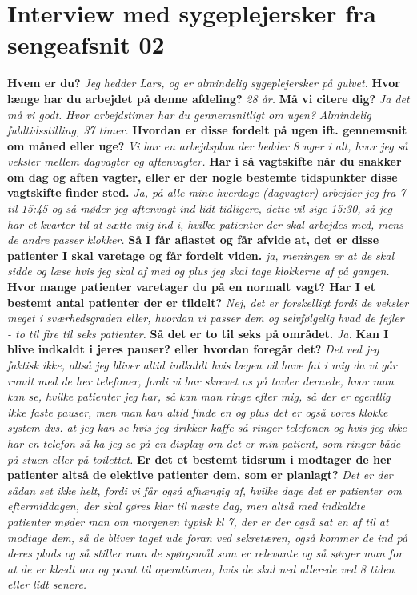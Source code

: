 \section{Interview med sygeplejersker fra sengeafsnit 02} \label{bilagO2}
\textbf{ Hvem er du?}
\textit{Jeg hedder Lars, og er almindelig sygeplejersker på gulvet.}
\textbf{Hvor længe har du arbejdet på denne afdeling?} 
\textit{28 år.}
\textbf{ Må vi citere dig? }
\textit{ Ja det må vi godt. }
\textit{Hvor arbejdstimer har du gennemsnitligt om ugen?}
\textit{ Almindelig fuldtidsstilling, 37 timer. }
\textbf{Hvordan er disse fordelt på ugen ift. gennemsnit om måned eller uge?}
\textit{Vi har en arbejdsplan der hedder 8 uger i alt, hvor jeg så veksler mellem dagvagter og aftenvagter.}
\textbf{Har i så vagtskifte når du snakker om dag og aften vagter, eller er der nogle bestemte tidspunkter disse vagtskifte finder sted.}
\textit{Ja, på alle mine hverdage (dagvagter) arbejder jeg fra 7 til 15:45 og så møder jeg aftenvagt ind lidt tidligere, dette vil sige 15:30, så jeg har et kvarter til at sætte mig ind i, hvilke patienter der skal arbejdes med, mens de andre passer klokker. }
\textbf{Så I får aflastet og får afvide at, det er disse patienter I skal varetage og får fordelt viden.}
\textit{ja, meningen er at de skal sidde og læse hvis jeg skal af med og plus jeg skal tage klokkerne af på gangen.}
\textbf{Hvor mange patienter varetager du på en normalt vagt? Har I et bestemt antal patienter der er tildelt?}
\textit{ Nej, det er forskelligt fordi de veksler meget i sværhedsgraden eller, hvordan vi passer dem og selvfølgelig hvad de fejler - to til fire til seks patienter.}
\textbf{ Så det er to til seks på området. }
\textit{Ja.}
\textbf{Kan I blive indkaldt i jeres pauser? eller hvordan foregår det?}
\textit{Det ved jeg faktisk ikke, altså jeg bliver altid indkaldt hvis lægen vil have fat i mig da vi går rundt med de her telefoner, fordi vi har skrevet os på tavler dernede, hvor man kan se, hvilke patienter jeg har, så kan man ringe efter mig, så der er egentlig ikke faste pauser, men man kan altid finde en og plus det er også vores klokke system dvs. at jeg kan se hvis jeg drikker kaffe så ringer telefonen og hvis jeg ikke har en telefon så ka jeg se på en display om det er min patient, som ringer både på stuen eller på toilettet.} 
\textbf{Er det et bestemt tidsrum i modtager de her patienter altså de elektive patienter dem, som er planlagt?}
\textit{Det er der sådan set ikke helt, fordi vi får også afhængig af, hvilke dage det er patienter om eftermiddagen, der skal gøres klar til næste dag, men altså med indkaldte patienter møder man om morgenen typisk kl 7, der er der også sat en af til at modtage dem, så de bliver taget ude foran ved sekretæren, også kommer de ind på deres plads og så stiller man de spørgsmål som er relevante og så sørger man for at de er klædt om og parat til operationen, hvis de skal ned allerede ved 8 tiden eller lidt senere. }
